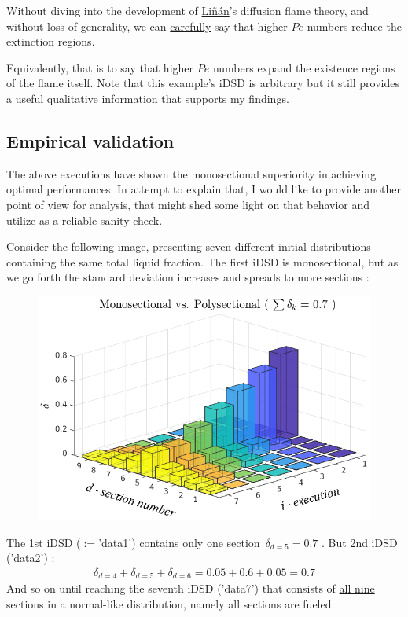 \documentclass[12pt]{article}
\numberwithin{equation}{section}
\begin{document}
\begin{flushleft}
Without diving into the development of \href{https://www.sciencedirect.com/science/article/abs/pii/0094576574900666}{Liñán}'s diffusion flame theory, and without loss of generality, we can \underline{carefully} say that higher $Pe$ numbers reduce the extinction regions. 

Equivalently, that is to say that higher $Pe$ numbers expand the existence regions of the flame itself. Note that this example's iDSD is arbitrary but it still provides a useful qualitative information that supports my findings. 

\subsection{Empirical validation} \label{validation}

The above executions have shown the monosectional superiority in achieving optimal performances. In attempt to explain that, I would like to provide another point of view for analysis, that might shed some light on that behavior and utilize as a reliable sanity check.

Consider the following image, presenting seven different initial distributions containing the same total liquid fraction. The first iDSD is monosectional, but as we go forth the standard deviation increases and spreads to more sections : \newline

\begin{figure}[H]
\centering
\includegraphics[width=0.75  \linewidth, center]{multi_combination_1.png}
\end{figure}
The 1st iDSD ($:=$'data1') contains only one section \,$\delta_{d=5}=0.7$ . But 2nd iDSD ('data2') :
\begin{align*}
\delta_{d=4} + \delta_{d=5} + \delta_{d=6} = 0.05 + 0.6+0.05 = 0.7
\end{align*}
And so on until reaching the seventh iDSD ('data7') that consists of \underline{all nine} sections in a normal-like distribution, namely all sections are fueled.


\end{flushleft}
\end{document}
